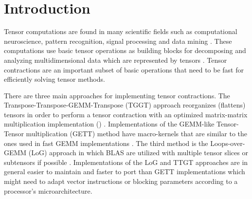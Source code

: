 \section{Introduction}
\label{sec:introduction}
Tensor computations are found in many scientific fields such as computational neuroscience, pattern recognition, signal processing and data mining \cite{karahan:2015:tensor, papalexakis:2017:tensors}.
These computations use basic tensor operations as building blocks for decomposing and analyzing multidimensional data which are represented by tensors \cite{lee:2018:fundamental, kolda:2009:decompositions}. 
Tensor contractions are an important subset of basic operations that need to be fast for efficiently solving tensor methods.

There are three main approaches for implementing tensor contractions.
The Transpose-Transpose-GEMM-Transpose (TGGT) approach reorganizes (flattens) tensors in order to perform a tensor contraction with an optimized matrix-matrix multiplication implementation () \cite{bader:2006:algorithm862, solomonik:2013:cyclops}.
Implementations of the GEMM-like Tensor-Tensor multiplication (GETT) method have macro-kernels that are similar to the ones used in fast GEMM implementations \cite{springer:2018:design, matthews:2018:high}.
The third method is the Loops-over-GEMM (LoG) approach in which BLAS are utilized with multiple tensor slices or subtensors if possible \cite{dinapoli:2014:towards.efficient.use, li:2015:input, shi:2016:tensor.contraction, bassoy:2019:ttv}.
Implementations of the LoG and TTGT approaches are in general easier to maintain and faster to port than GETT implementations which might need to adapt vector instructions or blocking parameters according to a processor's microarchitecture.


